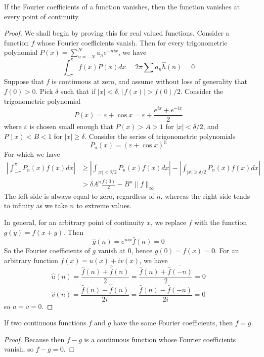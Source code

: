 \begin{theorem}
    If the Fourier coefficients of a function vanishes, then the function vanishes at every point of continuity.
\end{theorem}
\begin{proof}
    We shall begin by proving this for real valued functions. Consider a function $f$ whose Fourier coefficients vanish. Then for every trigonometric polynomial $P(x) = \sum_{n = -N}^N a_n e^{-nix}$, we have
    \[ \int_{-\pi}^\pi f(x) P(x) dx = 2 \pi \sum a_n \hat{h}(n) = 0 \]
    Suppose that $f$ is continuous at zero, and assume without loss of generality that $f(0) > 0$. Pick $\delta$ such that if $|x| < \delta$, $|f(x)| > f(0)/2$. Consider the trigonometric polynomial
    \[ P(x) = \varepsilon + \cos x = \varepsilon + \frac{e^{ix} + e^{-ix}}{2} \]
    where $\varepsilon$ is chosen small enough that $P(x) > A > 1$ for $|x| < \delta/2$, and $P(x) < B < 1$ for $|x| \geq \delta$. Consider the series of trigonometric polynomials
    \[ P_n(x) = (\varepsilon + \cos x)^n \]
    For which we have
    \begin{align*}
        \left| \int_{-\pi}^\pi P_n(x) f(x) dx \right| &\geq \left| \int_{|x| < \delta/2} P_n(x) f(x) dx \right| - \left| \int_{|x| \geq \delta/2} P_n(x) f(x) dx \right|\\
        &> \delta A^n \frac{f(0)}{2} - B^n \| f \|_{\infty}
    \end{align*}
    The left side is always equal to zero, regardless of $n$, whereas the right side tends to infinity as we take $n$ to extreme values.

    In general, for an arbitrary point of continuity $x$, we replace $f$ with the function $g(y) = f(x+y)$. Then
    \[ \hat{g}(n) = e^{nix} \hat{f}(n) = 0 \]
    So the Fourier coefficients of $g$ vanish at $0$, hence $g(0) = f(x) = 0$. For an arbitrary function $f(x) = u(x) + i v(x)$, we have
    \[ \hat{u}(n) = \frac{\hat{f}(n) + \widehat{\overline{f}}(n)}{2} = \frac{\hat{f}(n) + \overline{\hat{f}(-n)}}{2} = 0 \]
    \[ \hat{v}(n) = \frac{\hat{f}(n) - \widehat{\overline{f}}(n)}{2i} = \frac{\hat{f}(n) - \overline{\hat{f}(-n)}}{2i} = 0 \]
    so $u = v = 0$.
\end{proof}


\begin{corollary}
    If two continuous functions $f$ and $g$ have the same Fourier coefficients, then $f = g$.
\end{corollary}
\begin{proof}
    Because then $f - g$ is a continuous function whose Fourier coefficients vanish, so $f - g = 0$.
\end{proof}

